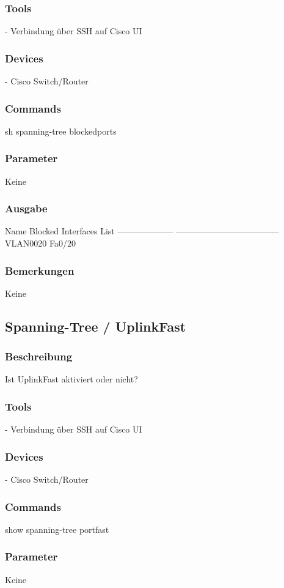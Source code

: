 \documentclass[a4,12pt]{scrartcl}
\begin{document}
\subsubsection{Tools}
- Verbindung über SSH auf Cisco UI 
\subsubsection{Devices}
- Cisco Switch/Router
\subsubsection{Commands}
sh spanning-tree blockedports
\subsubsection{Parameter}
Keine
\subsubsection{Ausgabe}
Name                 Blocked Interfaces List\newline
-------------------- ------------------------------------\newline
VLAN0020             Fa0/20\newline
\subsubsection{Bemerkungen}
Keine


\subsection{Spanning-Tree / UplinkFast}
\subsubsection{Beschreibung}
Ist UplinkFast aktiviert oder nicht?
\subsubsection{Tools}
- Verbindung über SSH auf Cisco UI 
\subsubsection{Devices}
- Cisco Switch/Router
\subsubsection{Commands}
show spanning-tree portfast
\subsubsection{Parameter}
Keine
\end{document}
